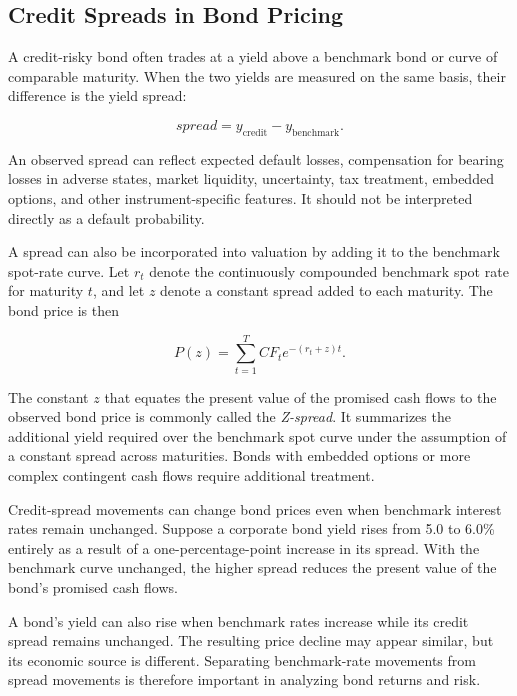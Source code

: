 \subsection{Credit Spreads in Bond Pricing}

A credit-risky bond often trades at a yield above a benchmark bond or curve of comparable maturity. When the two yields are measured on the same basis, their difference is the yield spread:

\begin{equation}
spread
=
y_{\mathrm{credit}}
-
y_{\mathrm{benchmark}}.
\label{eq:ch8-credit-spread}
\end{equation}

An observed spread can reflect expected default losses, compensation for bearing losses in adverse states, market liquidity, uncertainty, tax treatment, embedded options, and other instrument-specific features. It should not be interpreted directly as a default probability.

A spread can also be incorporated into valuation by adding it to the benchmark spot-rate curve. Let $r_t$ denote the continuously compounded benchmark spot rate for maturity $t$, and let $z$ denote a constant spread added to each maturity. The bond price is then

\begin{equation}
P(z)
=
\sum_{t=1}^{T}
CF_t e^{-(r_t+z)t}.
\label{eq:ch8-spread-price}
\end{equation}

The constant $z$ that equates the present value of the promised cash flows to the observed bond price is commonly called the \emph{Z-spread}. It summarizes the additional yield required over the benchmark spot curve under the assumption of a constant spread across maturities. Bonds with embedded options or more complex contingent cash flows require additional treatment.

Credit-spread movements can change bond prices even when benchmark interest rates remain unchanged. Suppose a corporate bond yield rises from 5.0 to 6.0\% entirely as a result of a one-percentage-point increase in its spread. With the benchmark curve unchanged, the higher spread reduces the present value of the bond's promised cash flows.

A bond's yield can also rise when benchmark rates increase while its credit spread remains unchanged. The resulting price decline may appear similar, but its economic source is different. Separating benchmark-rate movements from spread movements is therefore important in analyzing bond returns and risk.

